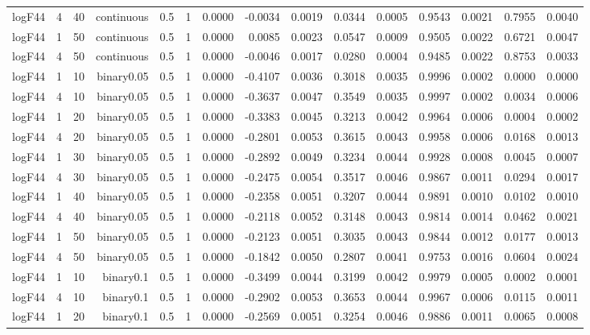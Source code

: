 \begin{longtable}{rrrrrrrrrrrrrrr}
  logF44 & 4 & 40 & continuous & 0.5 & 1 & 0.0000 & -0.0034 & 0.0019 & 0.0344 & 0.0005 & 0.9543 & 0.0021 & 0.7955 & 0.0040 \\ 
  logF44 & 1 & 50 & continuous & 0.5 & 1 & 0.0000 & 0.0085 & 0.0023 & 0.0547 & 0.0009 & 0.9505 & 0.0022 & 0.6721 & 0.0047 \\ 
  logF44 & 4 & 50 & continuous & 0.5 & 1 & 0.0000 & -0.0046 & 0.0017 & 0.0280 & 0.0004 & 0.9485 & 0.0022 & 0.8753 & 0.0033 \\ 
  logF44 & 1 & 10 & binary0.05 & 0.5 & 1 & 0.0000 & -0.4107 & 0.0036 & 0.3018 & 0.0035 & 0.9996 & 0.0002 & 0.0000 & 0.0000 \\ 
  logF44 & 4 & 10 & binary0.05 & 0.5 & 1 & 0.0000 & -0.3637 & 0.0047 & 0.3549 & 0.0035 & 0.9997 & 0.0002 & 0.0034 & 0.0006 \\ 
  logF44 & 1 & 20 & binary0.05 & 0.5 & 1 & 0.0000 & -0.3383 & 0.0045 & 0.3213 & 0.0042 & 0.9964 & 0.0006 & 0.0004 & 0.0002 \\ 
  logF44 & 4 & 20 & binary0.05 & 0.5 & 1 & 0.0000 & -0.2801 & 0.0053 & 0.3615 & 0.0043 & 0.9958 & 0.0006 & 0.0168 & 0.0013 \\ 
  logF44 & 1 & 30 & binary0.05 & 0.5 & 1 & 0.0000 & -0.2892 & 0.0049 & 0.3234 & 0.0044 & 0.9928 & 0.0008 & 0.0045 & 0.0007 \\ 
  logF44 & 4 & 30 & binary0.05 & 0.5 & 1 & 0.0000 & -0.2475 & 0.0054 & 0.3517 & 0.0046 & 0.9867 & 0.0011 & 0.0294 & 0.0017 \\ 
  logF44 & 1 & 40 & binary0.05 & 0.5 & 1 & 0.0000 & -0.2358 & 0.0051 & 0.3207 & 0.0044 & 0.9891 & 0.0010 & 0.0102 & 0.0010 \\ 
  logF44 & 4 & 40 & binary0.05 & 0.5 & 1 & 0.0000 & -0.2118 & 0.0052 & 0.3148 & 0.0043 & 0.9814 & 0.0014 & 0.0462 & 0.0021 \\ 
  logF44 & 1 & 50 & binary0.05 & 0.5 & 1 & 0.0000 & -0.2123 & 0.0051 & 0.3035 & 0.0043 & 0.9844 & 0.0012 & 0.0177 & 0.0013 \\ 
  logF44 & 4 & 50 & binary0.05 & 0.5 & 1 & 0.0000 & -0.1842 & 0.0050 & 0.2807 & 0.0041 & 0.9753 & 0.0016 & 0.0604 & 0.0024 \\ 
  logF44 & 1 & 10 & binary0.1 & 0.5 & 1 & 0.0000 & -0.3499 & 0.0044 & 0.3199 & 0.0042 & 0.9979 & 0.0005 & 0.0002 & 0.0001 \\ 
  logF44 & 4 & 10 & binary0.1 & 0.5 & 1 & 0.0000 & -0.2902 & 0.0053 & 0.3653 & 0.0044 & 0.9967 & 0.0006 & 0.0115 & 0.0011 \\ 
  logF44 & 1 & 20 & binary0.1 & 0.5 & 1 & 0.0000 & -0.2569 & 0.0051 & 0.3254 & 0.0046 & 0.9886 & 0.0011 & 0.0065 & 0.0008 \\ 

\end{longtable}
